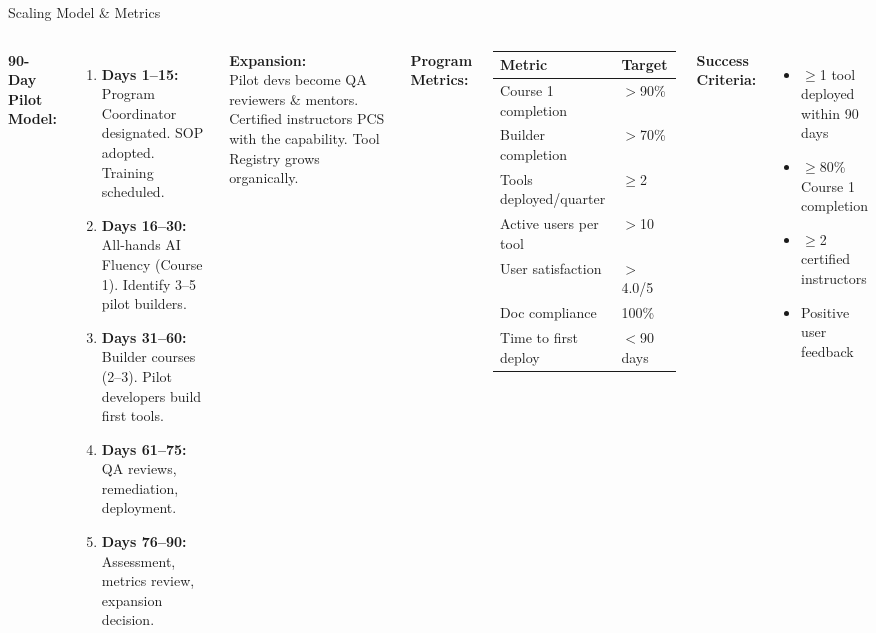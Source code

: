 \documentclass[aspectratio=169,11pt]{beamer}
\newcommand{\navy}[1]{\textbf{\color{navyblue}#1}}
\begin{document}
\begin{frame}[shrink=5]{Scaling Model \& Metrics}

\begin{columns}[T]

\navy{90-Day Pilot Model:}
\begin{enumerate}\small
  \item \textbf{Days 1--15:} Program Coordinator designated. SOP adopted. Training scheduled.
  \item \textbf{Days 16--30:} All-hands AI Fluency (Course 1). Identify 3--5 pilot builders.
  \item \textbf{Days 31--60:} Builder courses (2--3). Pilot developers build first tools.
  \item \textbf{Days 61--75:} QA reviews, remediation, deployment.
  \item \textbf{Days 76--90:} Assessment, metrics review, expansion decision.
\end{enumerate}

\vspace{4pt}
\navy{Expansion:}\\
{\small Pilot devs become QA reviewers \& mentors. Certified instructors PCS with the capability. Tool Registry grows organically.}


\navy{Program Metrics:}

\renewcommand{\arraystretch}{1.15}
{\small
\begin{tabular}{@{}p{3.5cm}p{2cm}@{}}
\toprule
\textbf{Metric} & \textbf{Target} \\
\midrule
Course 1 completion & $>$90\% \\
Builder completion & $>$70\% \\
Tools deployed/quarter & $\geq$2 \\
Active users per tool & $>$10 \\
User satisfaction & $>$4.0/5 \\
Doc compliance & 100\% \\
Time to first deploy & $<$90 days \\
\bottomrule
\end{tabular}
}

\vspace{8pt}

\navy{Success Criteria:}
\begin{itemize}\small
  \item $\geq$1 tool deployed within 90 days
  \item $\geq$80\% Course 1 completion
  \item $\geq$2 certified instructors
  \item Positive user feedback
\end{itemize}

\end{columns}

\end{frame}
\end{document}
